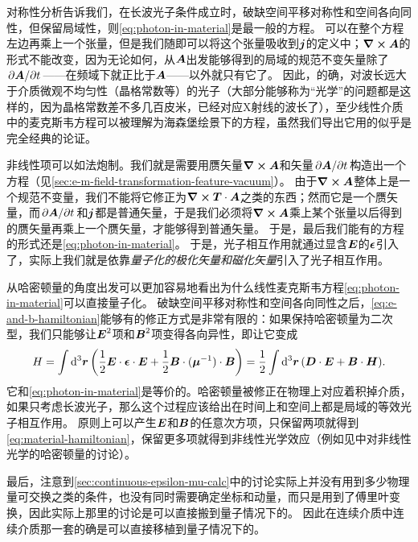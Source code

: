 对称性分析告诉我们，在长波光子条件成立时，破缺空间平移对称性和空间各向同性，但保留局域性，则\eqref{eq:photon-in-material}是最一般的方程。
可以在整个方程左边再乘上一个张量，但是我们随即可以将这个张量吸收到$\vb*{j}$的定义中；$\curl{\vb*{A}}$的形式不能改变，因为无论如何，从$\vb*{A}$出发能够得到的局域的规范不变矢量除了$\pdv*{\vb*{A}}{t}$——在频域下就正比于$\vb*{A}$——以外就只有它了。
因此，的确，对波长远大于介质微观不均匀性（晶格常数等）的光子（大部分能够称为“光学”的问题都是这样的，因为晶格常数差不多几百皮米，已经对应X射线的波长了），至少线性介质中的麦克斯韦方程可以被理解为海森堡绘景下的方程，虽然我们导出它用的似乎是完全经典的论证。

非线性项可以如法炮制。我们就是需要用赝矢量$\curl{\vb*{A}}$和矢量$\pdv*{\vb*{A}}{t}$构造出一个方程（见\autoref{sec:e-m-field-transformation-feature-vacuum}）。
由于$\curl{\vb*{A}}$整体上是一个规范不变量，我们不能将它修正为$\curl{\vb*{T} \cdot \vb*{A}}$之类的东西；然而它是一个赝矢量，而$\pdv*{\vb*{A}}{t}$和$\vb*{j}$都是普通矢量，于是我们必须将$\curl{\vb*{A}}$乘上某个张量以后得到的赝矢量再乘上一个赝矢量，才能够得到普通矢量。
于是，最后我们能有的方程的形式还是\eqref{eq:photon-in-material}。
于是，光子相互作用就通过显含$\vb*{E}$的$\vb*{\epsilon}$引入了，实际上我们就是依靠\emph{量子化的极化矢量和磁化矢量}引入了光子相互作用。

从哈密顿量的角度出发可以更加容易地看出为什么线性麦克斯韦方程\eqref{eq:photon-in-material}可以直接量子化。
破缺空间平移对称性和空间各向同性之后，\eqref{eq:e-and-b-hamiltonian}能够有的修正方式是非常有限的：如果保持哈密顿量为二次型，我们只能够让$\vb*{E}^2$项和$\vb*{B}^2$项变得各向异性，即让它变成
\begin{equation}
    H = \int \dd[3]{\vb*{r}} \left( \frac{1}{2} \vb*{E} \cdot \vb*{\epsilon} \cdot \vb*{E} + \frac{1}{2} \vb*{B} \cdot (\vb*{\mu}^{-1}) \cdot \vb*{B} \right) = \frac{1}{2} \int \dd[3]{\vb*{r}} (\vb*{D} \cdot \vb*{E} + \vb*{B} \cdot \vb*{H}).
    \label{eq:material-hamiltonian}
\end{equation}
它和\eqref{eq:photon-in-material}是等价的。哈密顿量被修正在物理上对应着积掉介质，如果只考虑长波光子，那么这个过程应该给出在时间上和空间上都是局域的等效光子相互作用。
原则上可以产生$\vb*{E}$和$\vb*{B}$的任意次方项，只保留两项就得到\eqref{eq:material-hamiltonian}，保留更多项就得到非线性光学效应（例如见\cite{drummond_hillery_2014}中对非线性光学的哈密顿量的讨论）。

最后，注意到\autoref{sec:continuous-epsilon-mu-calc}中的讨论实际上并没有用到多少物理量可交换之类的条件，也没有同时需要确定坐标和动量，而只是用到了傅里叶变换，因此实际上那里的讨论是可以直接搬到量子情况下的。
因此在连续介质中连续介质那一套的确是可以直接移植到量子情况下的。

